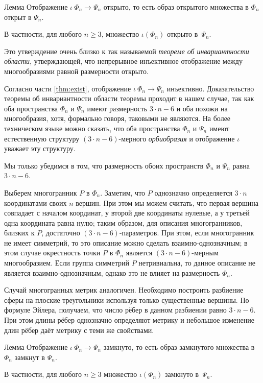 \documentclass[oneside,a4paper]{article}
\begin{document}
\begin{thm}{Лемма}
Отображение $\iota\:\Phi_n\to\Psi_n$ открыто, 
то есть образ открытого множества в $\Phi_n$ открыт в $\Psi_n$.

В частности, для любого $n\ge 3$, множество $\iota(\Phi_n)$ открыто в~$\Psi_n$.
\end{thm}

Это утверждение очень близко к так называемой \emph{теореме об инвариантности области}, утверждающей, что непрерывное инъективное отображение между многообразиями равной размерности открыто.

Согласно части \ref{thm:exist}, отображение $\iota\:\Phi_n\to\Psi_n$ инъективно.
Доказательство теоремы об инвариантности области теоремы проходит в нашем случае, так как оба пространства $\Phi_n$ и $\Psi_n$ имеют размерность $3\cdot n-6$ и оба похожи на многообразия, хотя, формально говоря, таковыми не являются.
На более техническом языке можно сказать, что оба пространства $\Phi_n$ и $\Psi_n$ имеют естественную структуру $(3\cdot n-6)$-мерного \emph{орбиобразия} и отображение $\iota$ уважает эту структуру.

Мы только убедимся в том, что размерность обоих пространств $\Phi_n$ и $\Psi_n$ равна $3\cdot n-6$.

Выберем многогранник $P$ в $\Phi_n$.
Заметим, что $P$ однозначно определяется $3\cdot n$ координатами своих $n$ вершин.
При этом мы можем считать, что первая вершина совпадает с началом координат, у второй две координаты нулевые, а у третьей одна координата равна нулю; таким образом, для описания многогранников, близких к $P$, достаточно $(3\cdot n-6)$-параметров.
При этом, если многогранник не имеет симметрий, то это описание можно сделать взаимно-однозначным;
в этом случае окрестность точки $P$ в $\Phi_n$ является $(3\cdot n-6)$-мерным многообразием.
Если группа симметрий $P$ нетривиальна,
то данное описание не является взаимно-однозначным, однако это не влияет на размерность $\Phi_n$.

Случай многогранных метрик аналогичен.
Необходимо построить разбиение сферы на плоские треугольники используя только существенные вершины.
По формуле Эйлера, получаем, что число рёбер в данном разбиении равно $3\cdot n-6$.
При этом длины рёбер однозначно определяют метрику и небольшое изменение длин рёбер даёт метрику с теми же свойствами.


\begin{thm}{Лемма}
Отображение $\iota\:\Phi_n\to\Psi_n$ замкнуто, 
то есть образ замкнутого множества в $\Phi_n$ замкнут в $\Psi_n$.

В частности, для любого $n\ge 3$ множество $\iota(\Phi_n)$ замкнуто в~$\Psi_n$.
\end{thm}
\end{document}
